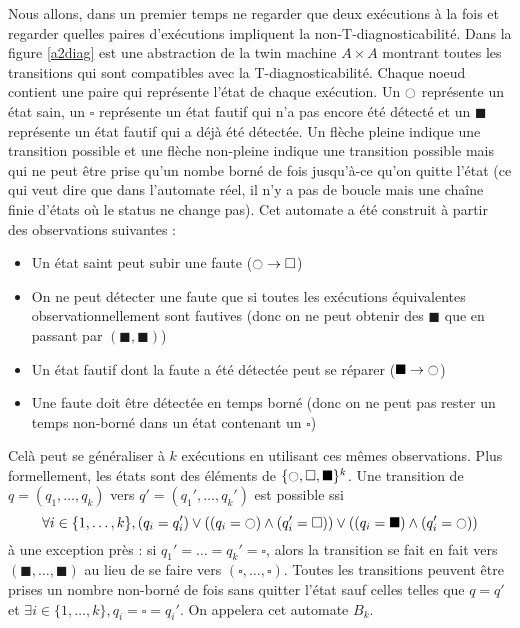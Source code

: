 \documentclass[10pt,a4paper]{article}
\newcommand{\es}{\square}
\newcommand{\fs}{\blacksquare}
\newcommand{\ec}{\ocircle}
\begin{document}
Nous allons, dans un premier temps ne regarder que deux exécutions à la fois et regarder quelles paires d'exécutions impliquent la non-T-diagnosticabilité. Dans la figure \ref{a2diag} est une abstraction de la twin machine $A\times A$ montrant toutes les transitions qui sont compatibles avec la T-diagnosticabilité. Chaque noeud contient une paire qui représente l'état de chaque exécution. Un $\ec$ représente un état sain, un $\es$ représente un état fautif qui n'a pas encore été détecté et un $\fs$ représente un état fautif qui a déjà été détectée. Un flèche pleine indique une transition possible et une flèche non-pleine indique une transition possible mais qui ne peut être prise qu'un nombe borné de fois jusqu'à-ce qu'on quitte l'état (ce qui veut dire que dans l'automate réel, il n'y a pas de boucle mais une chaîne finie d'états où le status ne change pas). Cet automate a été construit \`a partir des observations suivantes :
\begin{itemize}
	\item Un état saint peut subir une faute ($\ec \to \es$)
	\item On ne peut détecter une faute que si toutes les exécutions équivalentes observationnellement sont fautives (donc on ne peut obtenir des $\fs$ que en passant par $(\fs, \fs)$)
	\item Un état fautif dont la faute a été détectée peut se réparer ($\fs\to \ec$)
	\item Une faute doit être détectée en temps borné (donc on ne peut pas rester un temps non-borné dans un état contenant un $\es$)
\end{itemize}

Celà peut se généraliser à $k$ exécutions en utilisant ces mêmes observations. Plus formellement, les états sont des éléments de $\{\ec, \es, \fs \}^k$. Une transition de $q=(q_1, \dots, q_k)$ vers $q'=(q_1',\dots,q_k')$ est possible ssi $$\forall i \in \{1, \dots, k\}, (q_i = q_i')\lor ((q_i = \ec) \land (q_i'=\es)) \lor ((q_i = \fs)\land (q_i' = \ec))$$
\`a une exception près : si $q_1'=\dots=q_k'=\es$, alors la transition se fait en fait vers $(\fs, \dots, \fs)$ au lieu de se faire vers $(\es, \dots, \es)$. Toutes les transitions peuvent être prises un nombre non-borné de fois sans quitter l'état sauf celles telles que $q= q'$ et $\exists i\in \{1, \dots, k\}, q_i = \es = q_i'$. On appelera cet automate $B_k$.
\end{document}
